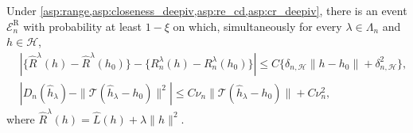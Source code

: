 \begin{lemma}\label{lemma:err_l_dp}
Under \cref{asp:range,asp:closeness_deepiv,asp:re_cd,asp:cr_deepiv}, there is an event $\mathcal E_n^{\mathrm R}$ with probability at least $1-\xi$ on which, simultaneously for every $\lambda\in\Lambda_n$ and $h\in\mathcal H$,
\begin{align}
&\left|\{\widehat R^\lambda(h)-\widehat R^\lambda(h_0)\}
-\{R_n^\lambda(h)-R_n^\lambda(h_0)\}\right|
\leqslant C\{\delta_{n,\mathcal H}\|h-h_0\|
+\delta_{n,\mathcal H}^2\},\label{eq:rdiv_fit_comparison}\\
&\left|D_n(\hat h_\lambda)
-\|\mathcal T(\hat h_\lambda-h_0)\|^2\right|
\leqslant C\nu_n\|\mathcal T(\hat h_\lambda-h_0)\|+C\nu_n^2,
\label{eq:rdiv_projected_comparison}
\end{align}
where $\widehat R^\lambda(h)=\widehat L(h)+\lambda\|h\|^2$.


\end{lemma}
